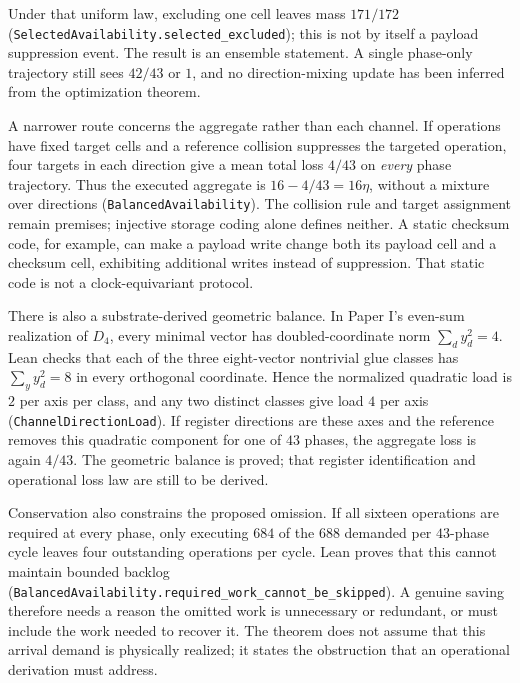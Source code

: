 Under that uniform law, excluding one cell leaves mass $171/172$ (\texttt{SelectedAvailability.selected\_excluded}); this is not by itself a payload suppression event. The result is an ensemble statement. A single phase-only trajectory still sees $42/43$ or $1$, and no direction-mixing update has been inferred from the optimization theorem.

A narrower route concerns the aggregate rather than each channel. If operations
have fixed target cells and a reference collision suppresses the targeted
operation, four targets in each direction give a mean total loss $4/43$ on
\emph{every} phase trajectory. Thus the executed aggregate is
$16-4/43=16\eta$, without a mixture over directions
(\texttt{BalancedAvailability}). The collision rule and target assignment remain
premises; injective storage coding alone defines neither. A static checksum code,
for example, can make a payload write change both its payload cell and a checksum
cell, exhibiting additional writes instead of suppression. That static code is
not a clock-equivariant protocol.

There is also a substrate-derived geometric balance. In Paper I's even-sum
realization of $D_4$, every minimal vector has doubled-coordinate norm
$\sum_d y_d^2=4$. Lean checks that each of the three eight-vector nontrivial glue
classes has $\sum_y y_d^2=8$ in every orthogonal coordinate. Hence the normalized
quadratic load is $2$ per axis per class, and any two distinct classes give load
$4$ per axis (\texttt{ChannelDirectionLoad}). If register directions are these
axes and the reference removes this quadratic component for one of $43$ phases,
the aggregate loss is again $4/43$. The geometric balance is proved; that
register identification and operational loss law are still to be derived.

Conservation also constrains the proposed omission. If all sixteen operations
are required at every phase, only executing $684$ of the $688$ demanded per
$43$-phase cycle leaves four outstanding operations per cycle. Lean proves that
this cannot maintain bounded backlog
(\texttt{BalancedAvailability.required\_work\_cannot\_be\_skipped}). A genuine
saving therefore needs a reason the omitted work is unnecessary or redundant,
or must include the work needed to recover it. The theorem does not assume
that this arrival demand is physically realized; it states the obstruction
that an operational derivation must address.

